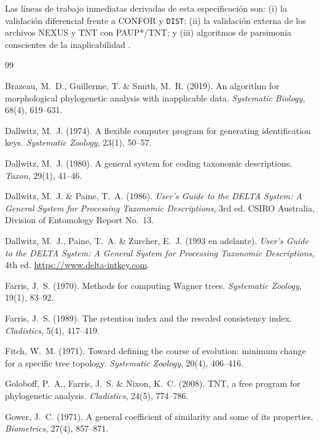 \documentclass[11pt,a4paper]{article}
\theoremstyle{definition}
\theoremstyle{remark}
\begin{document}
Las líneas de trabajo inmediatas derivadas de esta especificación son: (i) la validación diferencial frente a CONFOR y \texttt{DIST}; (ii) la validación externa de los archivos NEXUS y TNT con PAUP*/TNT; y (iii) algoritmos de parsimonia conscientes de la inaplicabilidad \cite{brazeau2019}.

\begin{thebibliography}{99}

Brazeau, M.~D., Guillerme, T. \& Smith, M.~R. (2019).
An algorithm for morphological phylogenetic analysis with inapplicable data.
\textit{Systematic Biology}, 68(4), 619--631.

Dallwitz, M.~J. (1974).
A flexible computer program for generating identification keys.
\textit{Systematic Zoology}, 23(1), 50--57.

Dallwitz, M.~J. (1980).
A general system for coding taxonomic descriptions.
\textit{Taxon}, 29(1), 41--46.

Dallwitz, M.~J. \& Paine, T.~A. (1986).
\textit{User's Guide to the DELTA System: A General System for Processing Taxonomic Descriptions}, 3rd ed.
CSIRO Australia, Division of Entomology Report No.~13.

Dallwitz, M.~J., Paine, T.~A. \& Zurcher, E.~J. (1993 en adelante).
\textit{User's Guide to the DELTA System: A General System for Processing Taxonomic Descriptions}, 4th ed.
\url{https://www.delta-intkey.com}.

Farris, J.~S. (1970).
Methods for computing Wagner trees.
\textit{Systematic Zoology}, 19(1), 83--92.

Farris, J.~S. (1989).
The retention index and the rescaled consistency index.
\textit{Cladistics}, 5(4), 417--419.

Fitch, W.~M. (1971).
Toward defining the course of evolution: minimum change for a specific tree topology.
\textit{Systematic Zoology}, 20(4), 406--416.

Goloboff, P.~A., Farris, J.~S. \& Nixon, K.~C. (2008).
TNT, a free program for phylogenetic analysis.
\textit{Cladistics}, 24(5), 774--786.

Gower, J.~C. (1971).
A general coefficient of similarity and some of its properties.
\textit{Biometrics}, 27(4), 857--871.


\end{thebibliography}
\end{document}
